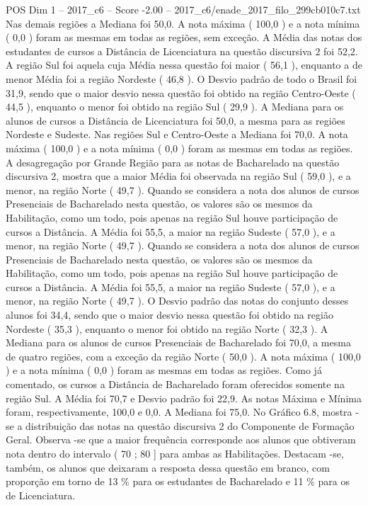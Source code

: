\begin{textsample}{POS Dim 1 – 2017\_c6 – Score -2.00 – 2017\_c6/enade\_2017\_filo\_299cb010c7.txt}
Nas demais regiões a Mediana foi 50,0.
A nota máxima ( 100,0 ) e a nota mínima ( 0,0 ) foram as mesmas em todas as regiões, sem exceção.
A Média das notas dos estudantes de cursos a Distância de Licenciatura na questão discursiva 2 foi 52,2.
A região Sul foi aquela cuja Média nessa questão foi maior ( 56,1 ), enquanto a de menor Média foi a região Nordeste ( 46,8 ).
O Desvio padrão de todo o Brasil foi 31,9, sendo que o maior desvio nessa questão foi obtido na região Centro-Oeste ( 44,5 ), enquanto o menor foi obtido na região Sul ( 29,9 ).
A Mediana para os alunos de cursos a Distância de Licenciatura foi 50,0, a mesma para as regiões Nordeste e Sudeste.
Nas regiões Sul e Centro-Oeste a Mediana foi 70,0.
A nota máxima ( 100,0 ) e a nota mínima ( 0,0 ) foram as mesmas em todas as regiões.
A desagregação por Grande Região para as notas de Bacharelado na questão discursiva 2, mostra que a maior Média foi observada na região Sul ( 59,0 ), e a menor, na região Norte ( 49,7 ).
Quando se considera a nota dos alunos de cursos Presenciais de Bacharelado nesta questão, os valores são os mesmos da Habilitação, como um todo, pois apenas na região Sul houve participação de cursos a Distância.
A Média foi 55,5, a maior na região Sudeste ( 57,0 ), e a menor, na região Norte ( 49,7 ).
Quando se considera a nota dos alunos de cursos Presenciais de Bacharelado nesta questão, os valores são os mesmos da Habilitação, como um todo, pois apenas na região Sul houve participação de cursos a Distância.
A Média foi 55,5, a maior na região Sudeste ( 57,0 ), e a menor, na região Norte ( 49,7 ).
O Desvio padrão das notas do conjunto desses alunos foi 34,4, sendo que o maior desvio nessa questão foi obtido na região Nordeste ( 35,3 ), enquanto o menor foi obtido na região Norte ( 32,3 ).
A Mediana para os alunos de cursos Presenciais de Bacharelado foi 70,0, a mesma de quatro regiões, com a exceção da região Norte ( 50,0 ).
A nota máxima ( 100,0 ) e a nota mínima ( 0,0 ) foram as mesmas em todas as regiões.
Como já comentado, os cursos a Distância de Bacharelado foram oferecidos somente na região Sul.
A Média foi 70,7 e Desvio padrão foi 22,9.
As notas Máxima e Mínima foram, respectivamente, 100,0 e 0,0.
A Mediana foi 75,0.
No Gráfico 6.8, mostra -se a distribuição das notas na questão discursiva 2 do Componente de Formação Geral.
Observa -se que a maior frequência corresponde aos alunos que obtiveram nota dentro do intervalo ( 70 ; 80 ] para ambas as Habilitações.
Destacam -se, também, os alunos que deixaram a resposta dessa questão em branco, com proporção em torno de 13 \% para os estudantes de Bacharelado e 11 \% para os de Licenciatura.

\end{textsample}
